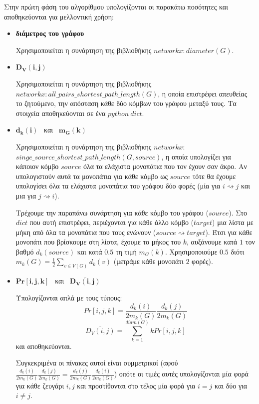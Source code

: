 \documentclass[12pt, letterpaper]{article}
\begin{document}
Στην πρώτη φάση του αλγορίθμου υπολογίζονται οι παρακάτω ποσότητες και αποθηκεύονται
για μελλοντική χρήση:
\begin{itemize}
    \item \textbf{διάμετρος του γράφου } 
    
    Χρησιμοποιείται η συνάρτηση της βιβλιοθήκης $networkx: diameter(G)$.
    
    \item  $\mathbf{D_V(i,j)}$
    
    Χρησιμοποιείται η συνάρτηση της βιβλιοθήκης $networkx: all\_pairs\_shortest\_path\_length(G)$,
    η οποία επιστρέφει απευθείας το ζητούμενο, την απόσταση κάθε δύο κόμβων του γράφου
    μεταξύ τους. Τα στοιχεία αποθηκεύονται σε ένα $python \ dict$.


    \item  $\mathbf{d_k(i)}$ \ και \ $\mathbf{m_G(k)}$
    
    Χρησιμοποιείται η συνάρτηση της βιβλιοθήκης $networkx:$ \\
    $ singe\_source\_shortest\_path\_length(G,source)$, η οποία υπολογίζει για κάποιον
    κόμβο $source$ όλα τα ελάχιστα μονοπάτια που τον έχουν σαν άκρο. Αν υπολογιστούν 
    αυτά τα μονοπάτια για κάθε κόμβο ως $source$ τότε θα έχουμε υπολογίσει
    όλα τα ελάχιστα μονοπάτια του γράφου δύο φορές (μία για $i \rightsquigarrow j$ και 
    μια για $j \rightsquigarrow i$).

    Τρέχουμε την παραπάνω συνάρτηση για κάθε κόμβο του γράφου ($source$). Στο $dict$ που 
    αυτή επιστρέφει, περιέχονται για κάθε άλλο κόμβο  ($target$) μια λίστα με μήκη από όλα
    τα μονοπάτια που τους ενώνουν ($source \rightsquigarrow target$). Έτσι για κάθε 
    μονοπάτι που βρίσκουμε στη λίστα, έχουμε το μήκος του $k$, 
    αυξάνουμε κατά $1$ τον βαθμό $d_k(source)$ και κατά $0.5$ τη τιμή 
    $m_G(k)$. Χρησιμοποιούμε $0.5$ διότι $m_k(G) = \frac{1}{2} \sum_{v \in V (G)} d_k(v)$
    (μετράμε κάθε μονοπάτι $2$ φορές).


    \item $\mathbf{Pr[i,j,k]}$  \ και \   $\mathbf{\overline{D_V(i,j)}}$
    
    Υπολογίζονται απλά με τους τύπους:
    \[ Pr[i,j,k] = \frac{d_k(i)}{2m_k(G)} \frac{d_k(j)}{2m_k(G)} \]
    \[ \overline{D_V(i,j)} = \sum_{k=1}^{diam(G)} k Pr[i,j,k] \]
    και αποθηκεύονται. 
    
    Συγκεκριμένα οι πίνακες αυτοί είναι συμμετρικοί (αφού 
    $\frac{d_k(i)}{2m_k(G)} \frac{d_k(j)}{2m_k(G)} = \frac{d_k(j)}{2m_k(G)} \frac{d_k(i)}{2m_k(G)}$)
    οπότε οι τιμές αυτές υπολογίζονται μία φορά για κάθε ζευγάρι $i,j$ και προστίθονται
    στο τέλος μία φορά για $i=j$ και δύο για $i \neq j$.
    


\end{itemize}
\end{document}
